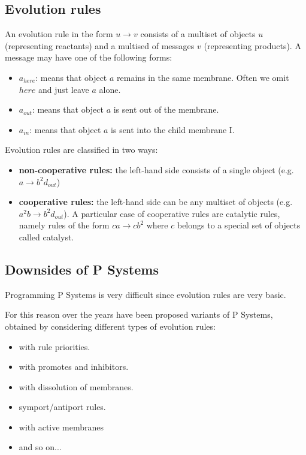 \subsection{Evolution rules}
An evolution rule in the form $u \rightarrow v$ consists of a multiset of objects $u$ (representing reactants) and a multised of messages $v$ (representing products). A message may have one of the following forms:
\begin{itemize}
    \item $a_{here}$: means that object $a$ remains in the same membrane. Often we omit $here$ and just leave $a$ alone.
    \item $a_{out}$: means that object $a$ is sent out of the membrane.
    \item $a_{in}$: means that object $a$ is sent into the child membrane I.
\end{itemize}

Evolution rules are classified in two ways:
\begin{itemize}
    \item \textbf{non-cooperative rules:} the left-hand side consists of a single object (e.g. $a \rightarrow b^{2}d_{out}$)
    \item \textbf{cooperative rules:} the left-hand side can be any multiset of objects (e.g. $a^{2}b \rightarrow b^{2}d_{out}$). A particular case of cooperative rules are catalytic rules, namely rules of the form $ca \rightarrow cb^{2}$ where $c$ belongs to a special set of objects called catalyst.
\end{itemize}

\subsection{Downsides of P Systems}
Programming P Systems is very difficult since evolution rules are very basic.\par
For this reason over the years have been proposed variants of P Systems, obtained by considering different types of evolution rules:
\begin{itemize}
    \item with rule priorities.
    \item with promotes and inhibitors.
    \item with dissolution of membranes.
    \item symport/antiport rules.
    \item with active membranes 
    \item and so on...
\end{itemize}